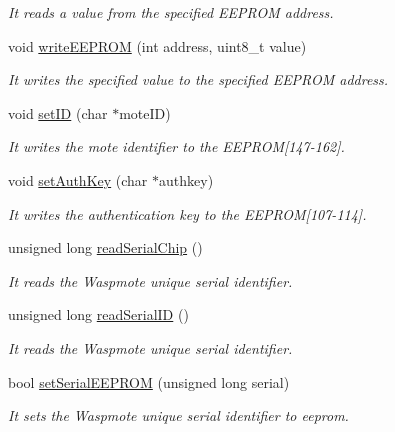 \begin{DoxyCompactItemize}
\begin{DoxyCompactList}\small\item\em It reads a value from the specified E\+E\+P\+R\+OM address. \end{DoxyCompactList}\item 
void \hyperlink{class_wasp_utils_a401def82a1d34d851a06b9bdfe78c048}{write\+E\+E\+P\+R\+OM} (int address, uint8\+\_\+t value)
\begin{DoxyCompactList}\small\item\em It writes the specified value to the specified E\+E\+P\+R\+OM address. \end{DoxyCompactList}\item 
void \hyperlink{class_wasp_utils_a02d2fae05f552f9e1550225077fbd7eb}{set\+ID} (char $\ast$mote\+ID)
\begin{DoxyCompactList}\small\item\em It writes the mote identifier to the E\+E\+P\+R\+OM\mbox{[}147-\/162\mbox{]}. \end{DoxyCompactList}\item 
void \hyperlink{class_wasp_utils_a94792215e1e986e9d02e6d74be72fd54}{set\+Auth\+Key} (char $\ast$authkey)
\begin{DoxyCompactList}\small\item\em It writes the authentication key to the E\+E\+P\+R\+OM\mbox{[}107-\/114\mbox{]}. \end{DoxyCompactList}\item 
unsigned long \hyperlink{class_wasp_utils_a5ba11552c66a83eda1a2cacf613789f1}{read\+Serial\+Chip} ()
\begin{DoxyCompactList}\small\item\em It reads the Waspmote unique serial identifier. \end{DoxyCompactList}\item 
unsigned long \hyperlink{class_wasp_utils_af8f959b98a6904a60519f20a716450fd}{read\+Serial\+ID} ()
\begin{DoxyCompactList}\small\item\em It reads the Waspmote unique serial identifier. \end{DoxyCompactList}\item 
bool \hyperlink{class_wasp_utils_aa773c77439e93733ed7f76998e6f1c78}{set\+Serial\+E\+E\+P\+R\+OM} (unsigned long serial)
\begin{DoxyCompactList}\small\item\em It sets the Waspmote unique serial identifier to eeprom. \end{DoxyCompactList}\item 

\end{DoxyCompactItemize}
